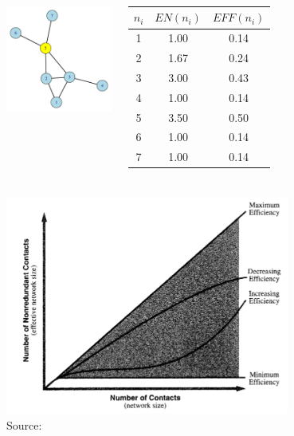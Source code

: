 \documentclass[8pt]{beamer}
\begin{document}
\begin{frame}
\frametitle{\insertsection}
\framesubtitle{\insertsubsection}

\begin{columns}
	\centering 
	\includegraphics[width=5cm]{effective}
	
	
	\small
	\renewcommand{\arraystretch}{1.5}
	\begin{table}
	\begin{tabular}{ccc}
		\toprule
	$n_i$ & $EN(n_i)$ & $EFF(n_i)$\\
	\hline
	1 & 1.00 & 0.14\\
	2 & 1.67 & 0.24\\
	3 & 3.00 & 0.43\\
	4 & 1.00 & 0.14\\
	5 & 3.50 & 0.50\\
	6 & 1.00 & 0.14\\
	7 & 1.00 & 0.14\\
	\bottomrule
	\end{tabular}
	\end{table}
\end{columns}
\end{frame}

\begin{frame}
\frametitle{\insertsection}
\framesubtitle{\insertsubsection}


\centering 
\includegraphics[width = 0.7\textwidth]{efficiency_burt}\\
\tiny{Source: \cite{Burt1992}}

\end{frame}
\end{document}
